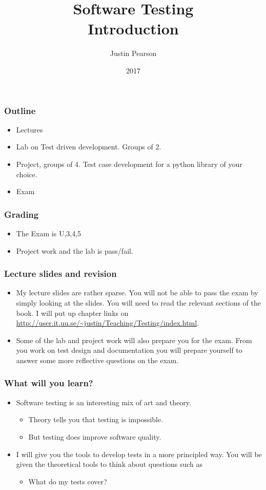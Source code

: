 \documentclass{beamer}
\title{Software Testing \\ Introduction}
\author{Justin Pearson}
\date{2017}
\begin{document}
\lstset{language=python}

\begin{frame}
  \maketitle
\end{frame}
\begin{frame}
  \frametitle{Outline}
  \begin{itemize}
  \item Lectures
  \item Lab on Test driven development. Groups of 2.
  \item Project, groups of 4. Test case development for a python
    library of your choice.
  \item Exam
  \end{itemize}
\end{frame}
\begin{frame}
  \frametitle{Grading}
  \begin{itemize}
  \item The Exam is U,3,4,5
  \item Project work and the lab is pass/fail.
  \end{itemize}
\end{frame}
\begin{frame}
  \frametitle{Lecture slides and revision}
  \begin{itemize}
  \item   My lecture slides are rather sparse. You will not be able to pass
  the exam by simply looking at the slides. You will need to read the
  relevant sections of the book. I will put up chapter links on
  \url{http://user.it.uu.se/~justin/Teaching/Testing/index.html}.
\item Some of the lab and project work will also prepare you for the
  exam. From you work on test design and documentation you will
  prepare yourself to answer some more reflective questions on the exam.
  \end{itemize}
\end{frame}
\begin{frame}
  \frametitle{What will you learn?}
  \begin{itemize}
  \item Software testing is an interesting mix of art and theory.
    \begin{itemize}
    \item Theory tells you that testing is impossible.
    \item But testing does improve software quality.
    \end{itemize}
  \item I will give you the tools to develop tests in a more
    principled way. You will be given the theoretical tools to think
    about questions such as
    \begin{itemize}
    \item What do my tests cover?
    \end{itemize}
  \end{itemize}
\end{frame}
\end{document}
